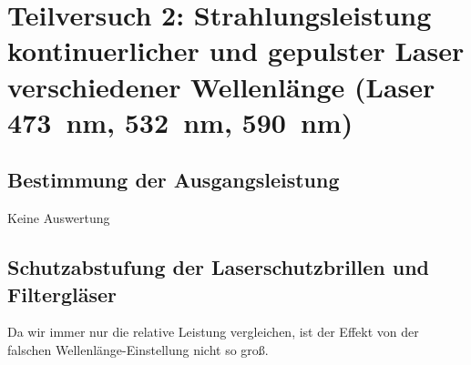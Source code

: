 \section{Teilversuch 2: Strahlungsleistung kontinuerlicher und gepulster Laser verschiedener Wellenlänge (Laser \SI{473}{\nano\meter}, \SI{532}{\nano\meter}, \SI{590}{\nano\meter})}
	\resnum
	\subsection{Bestimmung der Ausgangsleistung}
		Keine Auswertung
	\subsection{Schutzabstufung der Laserschutzbrillen und Filtergläser}
		Da wir immer nur die relative Leistung vergleichen, ist der Effekt von der falschen Wellenlänge-Einstellung nicht so groß.

